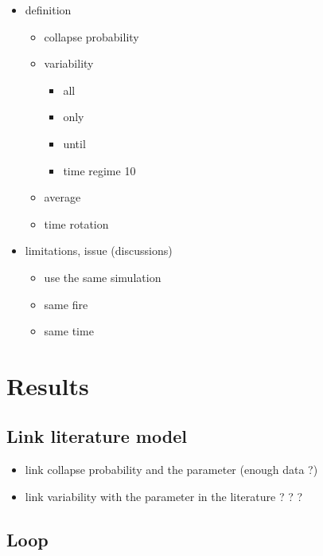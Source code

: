 \documentclass{article}
\begin{document}
\begin{itemize}
    \item definition
    \begin{itemize}
        \item collapse probability
        \item variability
            \begin{itemize}
                \item all
                \item only
                \item until
                \item time regime 10
            \end{itemize}
        \item average
        \item time rotation
    \end{itemize}
    \item limitations, issue (discussions)
    \begin{itemize}
        \item use the same simulation
        \item same fire
        \item same time
    \end{itemize}
\end{itemize}





\newpage
\section{Results}

\subsection{Link literature model}

\begin{itemize}
    \item link collapse probability and the parameter (enough data ?)
    \item link variability with the parameter in the literature ? ? ? 
\end{itemize}

\subsection{Loop}
\end{document}
